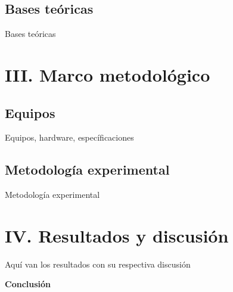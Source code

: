 \documentclass[12pt, letter paper]{report}
\begin{document}
    \section{Bases teóricas} %
    \label{sec:bases_teóricas}
      Bases teóricas

  \chapter{III. Marco metodológico} %
  \label{cha:iii_marco_metodológico}
    \section{Equipos} %
    \label{sec:equipos}
      Equipos, hardware, específicaciones

    \section{Metodología experimental} %
    \label{sec:metodología_experimental}
      Metodología experimental

  \chapter{IV. Resultados y discusión} %
  \label{cha:iv_resultados_y_discusión}
    Aquí van los resultados con su respectiva discusión

  \newpage
  \begin{center}
    \Large \textbf{Conclusión}
  \end{center}

  
  \nocite{*}
\end{document}
